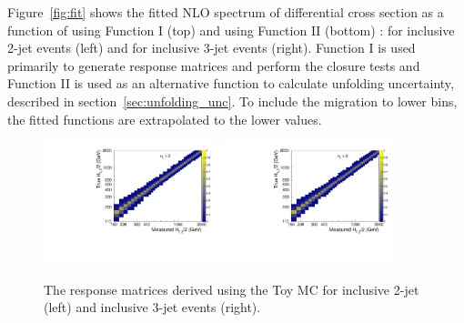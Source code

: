 Figure~\ref{fig:fit} shows the fitted NLO spectrum of differential cross section as a function of \httwo using Function I (top) and using 
Function II (bottom) : for inclusive 2-jet events (left) and for inclusive 3-jet events (right). Function I is used primarily to 
generate response matrices and perform the closure tests and Function II is used as an alternative function to calculate unfolding 
uncertainty, described in section~\ref{sec:unfolding_unc}. To include the migration to lower bins, the fitted functions are extrapolated to 
the lower \httwo values.

\begin{figure}[!htbp]
  \begin{center}
    \includegraphics[width=0.45\textwidth]{Plots_HT_2_150/Normalized_Response_Matrix_NLO_2_range_column.pdf}%
    \includegraphics[width=0.45\textwidth]{Plots_HT_2_150/Normalized_Response_Matrix_NLO_3_column.pdf} 
    \caption{The response matrices derived using the Toy MC for inclusive 2-jet (left) and inclusive 3-jet events (right).}
    \label{fig:response_NLO}


\end{center}
\end{figure}
